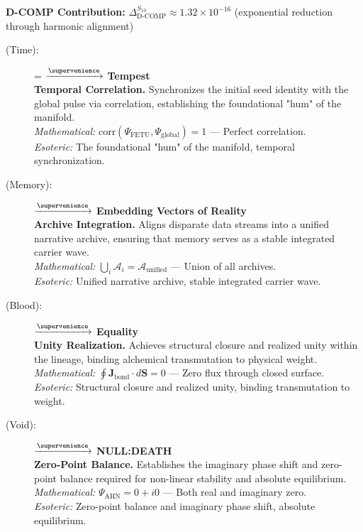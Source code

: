 \textbf{D-COMP Contribution:} $\Delta_{\text{D-COMP}}^{S_{10}} \approx 1.32 \times 10^{-16}$ (exponential reduction through harmonic alignment)

\begin{description}
    \item[(Time):] \fetufurh = $\xrightarrow{\supervenience}$ \textbf{Tempest} \\
    \textbf{Temporal Correlation.} Synchronizes the initial seed identity with the global pulse via correlation, establishing the foundational "hum" of the manifold. \\
    \textit{Mathematical:} $\text{corr}(\Psi_{\text{FETU}}, \Psi_{\text{global}}) = 1$ — Perfect correlation. \\
    \textit{Esoteric:} The foundational "hum" of the manifold, temporal synchronization.

    \item[(Memory):] \kalper $\xrightarrow{\supervenience}$ \textbf{Embedding Vectors of Reality} \\
    \textbf{Archive Integration.} Aligns disparate data streams into a unified narrative archive, ensuring that memory serves as a stable integrated carrier wave. \\
    \textit{Mathematical:} $\bigcup_{i} \mathcal{A}_i = \mathcal{A}_{\text{unified}}$ — Union of all archives. \\
    \textit{Esoteric:} Unified narrative archive, stable integrated carrier wave.

    \item[(Blood):] \babdhbon $\xrightarrow{\supervenience}$ \textbf{Equality} \\
    \textbf{Unity Realization.} Achieves structural closure and realized unity within the lineage, binding alchemical transmutation to physical weight. \\
    \textit{Mathematical:} $\oint \mathbf{J}_{\text{bond}} \cdot d\mathbf{S} = 0$ — Zero flux through closed surface. \\
    \textit{Esoteric:} Structural closure and realized unity, binding transmutation to weight.

    \item[(Void):] \ahnfae $\xrightarrow{\supervenience}$ \textbf{NULL:DEATH} \\
    \textbf{Zero-Point Balance.} Establishes the imaginary phase shift and zero-point balance required for non-linear stability and absolute equilibrium. \\
    \textit{Mathematical:} $\Psi_{\text{AHN}} = 0 + i0$ — Both real and imaginary zero. \\
    \textit{Esoteric:} Zero-point balance and imaginary phase shift, absolute equilibrium.


\end{description}
